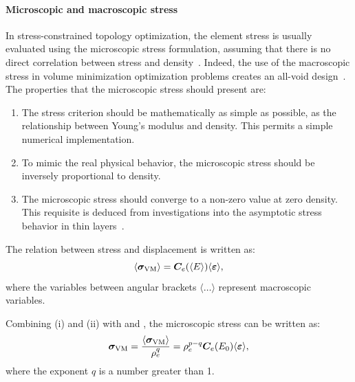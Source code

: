 \paragraph{Microscopic and macroscopic stress}
In stress-constrained topology optimization, the element stress is usually evaluated using the microscopic stress formulation, assuming that there is no direct correlation between stress and density~. Indeed, the use of the macroscopic stress in volume minimization optimization problems creates an all-void design~. The properties that the microscopic stress should present are:
\begin{enumerate}[label=(\roman*)]
    \item The stress criterion should be mathematically as simple as possible, as the relationship between Young's modulus and density. This permits a simple numerical implementation.
    \item To mimic the real physical behavior, the microscopic stress should be inversely proportional to density.
    \item The microscopic stress should converge to a non-zero value at zero density. This requisite is deduced from investigations into the asymptotic stress behavior in thin layers~\cite{verbart_unified_2017}.
\end{enumerate}

The relation between stress and displacement is written as:
\begin{equation}
    \langle \bm{\sigma}_{\text{VM}} \rangle = \bm{C}_e(\langle E \rangle) \langle \bm{\varepsilon} \rangle,
    \label{eq:03_stress_disp}
\end{equation}
where the variables between angular brackets $\langle \dots \rangle$ represent macroscopic variables. 

Combining (i) and (ii) with  and , the microscopic stress can be written as:
\begin{equation}
    \bm{\sigma}_{\text{VM}} = \frac{\langle \bm{\sigma}_{\text{VM}} \rangle}{\rho^q_e} = \rho_e^{p-q} \bm{C}_e(E_0)\langle \bm{\varepsilon} \rangle,
\end{equation}
where the exponent $q$ is a number greater than 1.

